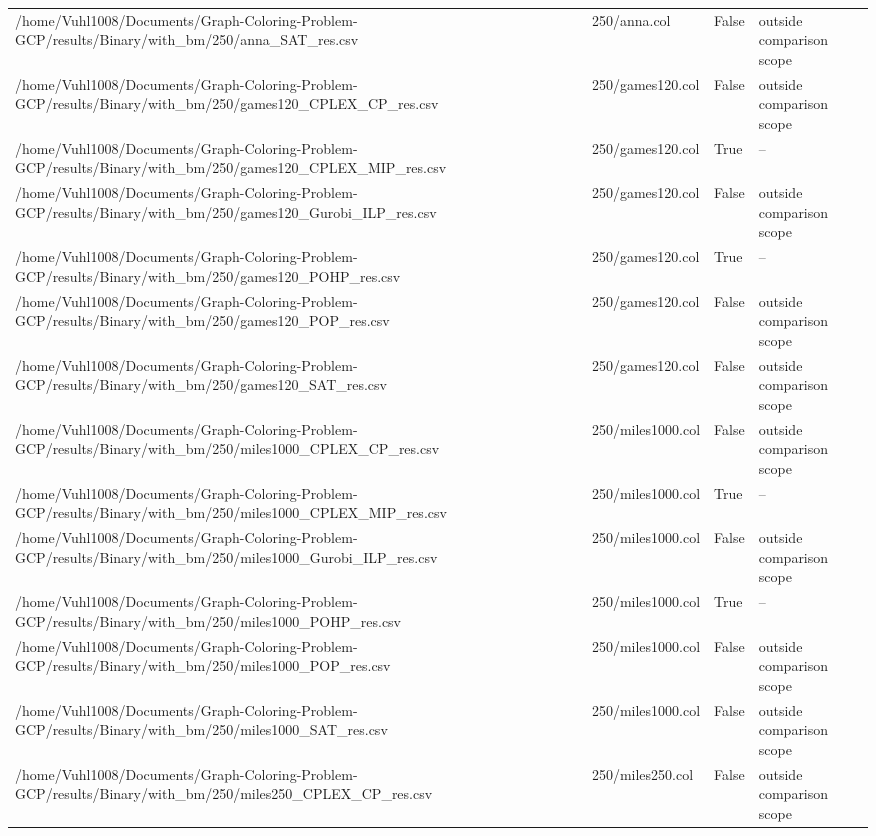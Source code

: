 \begin{table}[htbp]
\begin{tabular}{llll}
/home/Vuhl1008/Documents/Graph-Coloring-Problem-GCP/results/Binary/with\_bm/250/anna\_SAT\_res.csv & 250/anna.col & False & outside comparison scope \\
/home/Vuhl1008/Documents/Graph-Coloring-Problem-GCP/results/Binary/with\_bm/250/games120\_CPLEX\_CP\_res.csv & 250/games120.col & False & outside comparison scope \\
/home/Vuhl1008/Documents/Graph-Coloring-Problem-GCP/results/Binary/with\_bm/250/games120\_CPLEX\_MIP\_res.csv & 250/games120.col & True & -- \\
/home/Vuhl1008/Documents/Graph-Coloring-Problem-GCP/results/Binary/with\_bm/250/games120\_Gurobi\_ILP\_res.csv & 250/games120.col & False & outside comparison scope \\
/home/Vuhl1008/Documents/Graph-Coloring-Problem-GCP/results/Binary/with\_bm/250/games120\_POHP\_res.csv & 250/games120.col & True & -- \\
/home/Vuhl1008/Documents/Graph-Coloring-Problem-GCP/results/Binary/with\_bm/250/games120\_POP\_res.csv & 250/games120.col & False & outside comparison scope \\
/home/Vuhl1008/Documents/Graph-Coloring-Problem-GCP/results/Binary/with\_bm/250/games120\_SAT\_res.csv & 250/games120.col & False & outside comparison scope \\
/home/Vuhl1008/Documents/Graph-Coloring-Problem-GCP/results/Binary/with\_bm/250/miles1000\_CPLEX\_CP\_res.csv & 250/miles1000.col & False & outside comparison scope \\
/home/Vuhl1008/Documents/Graph-Coloring-Problem-GCP/results/Binary/with\_bm/250/miles1000\_CPLEX\_MIP\_res.csv & 250/miles1000.col & True & -- \\
/home/Vuhl1008/Documents/Graph-Coloring-Problem-GCP/results/Binary/with\_bm/250/miles1000\_Gurobi\_ILP\_res.csv & 250/miles1000.col & False & outside comparison scope \\
/home/Vuhl1008/Documents/Graph-Coloring-Problem-GCP/results/Binary/with\_bm/250/miles1000\_POHP\_res.csv & 250/miles1000.col & True & -- \\
/home/Vuhl1008/Documents/Graph-Coloring-Problem-GCP/results/Binary/with\_bm/250/miles1000\_POP\_res.csv & 250/miles1000.col & False & outside comparison scope \\
/home/Vuhl1008/Documents/Graph-Coloring-Problem-GCP/results/Binary/with\_bm/250/miles1000\_SAT\_res.csv & 250/miles1000.col & False & outside comparison scope \\
/home/Vuhl1008/Documents/Graph-Coloring-Problem-GCP/results/Binary/with\_bm/250/miles250\_CPLEX\_CP\_res.csv & 250/miles250.col & False & outside comparison scope \\

\end{tabular}
\end{table}
